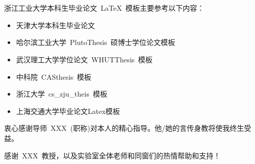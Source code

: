 
\chapter{\acknowledgementtitle}

浙江工业大学本科生毕业论文~\LaTeX~模板主要参考以下内容：
\begin{itemize}
  \item 天津大学本科生毕业论文
  \item 哈尔滨工业大学~PlutoThesis~硕博士学位论文模板
  \item 武汉理工大学学位论文~WHUTThesis~模板
  \item 中科院~CASthesis~模板
  \item 浙江大学~cs\_zju\_theis~模板
  \item 上海交通大学毕业论文Latex模板
\end{itemize}

\vspace*{1em}

衷心感谢导师~XXX~(职称)对本人的精心指导。他/她的言传身教将使我终生受益。

感谢~XXX~教授，以及实验室全体老师和同窗们的热情帮助和支持！




